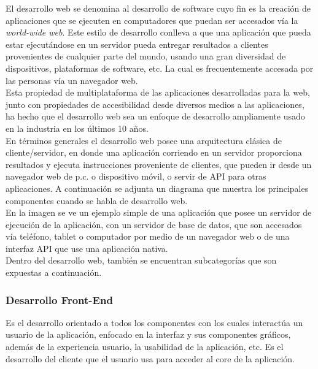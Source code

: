 El desarrollo web se denomina al desarrollo de software cuyo fin es la creación de aplicaciones que se ejecuten en computadores que puedan ser accesados vía la \emph{world-wide web}. Este estilo de desarrollo conlleva a que una aplicación que pueda estar ejecutándose en un servidor pueda entregar resultados a clientes provenientes de cualquier parte del mundo, usando una gran diversidad de dispositivos, plataformas de software, etc. La cual es frecuentemente accesada por las personas vía un navegador web.\\

Esta propiedad de multiplataforma de las aplicaciones desarrolladas para la web, junto con propiedades de accesibilidad desde diversos medios a las aplicaciones, ha hecho que el desarrollo web sea un enfoque de desarrollo ampliamente usado en la industria en los últimos 10 años.\\

En términos generales el desarrollo web posee una arquitectura clásica de cliente/servidor, en donde una aplicación corriendo en un servidor proporciona resultados y ejecuta instrucciones proveniente de clientes, que pueden ir desde un navegador web de p.c. o dispositivo móvil, o servir de API para otras aplicaciones. A continuación se adjunta un diagrama que muestra los principales componentes cuando se habla de desarrollo web.\\


En la imagen se ve un ejemplo simple de una aplicación que posee un servidor de ejecución de la aplicación, con un servidor de base de datos, que son accesados vía teléfono, tablet o computador por medio de un navegador web o de una interfaz API que use una aplicación nativa.\\

Dentro del desarrollo web, también se encuentran subcategorías que son expuestas a continuación.

\subsubsection{Desarrollo Front-End} %
\label{ssub:desarrollo_front_end}

Es el desarrollo orientado a todos los componentes con los cuales interactúa un usuario de la aplicación, enfocado en la interfaz y sus componentes gráficos, además de la experiencia usuario, la usabilidad de la aplicación, etc. Es el desarrollo del cliente que el usuario usa para acceder al core de la aplicación.\\

